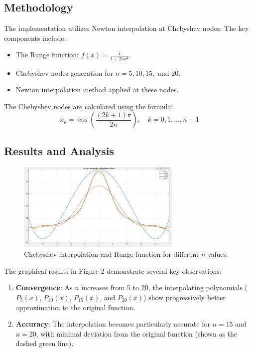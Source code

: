 \documentclass{article}
\begin{document}
\subsection{Methodology}
The implementation utilizes Newton interpolation at Chebyshev nodes. The key components include:
\begin{itemize}
\item The Runge function: $f(x) = \frac{1}{1 + 25x^2}$.
\item Chebyshev nodes generation for $n = 5, 10, 15,$ and $20$.
\item Newton interpolation method applied at these nodes.
\end{itemize}
The Chebyshev nodes are calculated using the formula:
\[x_k = \cos\left(\frac{(2k+1)\pi}{2n}\right), \quad k = 0,1,\ldots,n-1\]
\subsection{Results and Analysis}
\begin{figure}[H]
    \centering
    \includegraphics[width=0.7\textwidth]{runge2.png}
    \caption{Chebyshev interpolation and Runge function for different $n$ values.}
    \label{fig:runge_plot}
\end{figure}
The graphical results in Figure 2 demonstrate several key observations:
\begin{enumerate}
\item \textbf{Convergence}: As $n$ increases from 5 to 20, the interpolating polynomials ($P_5(x)$, $P_{10}(x)$, $P_{15}(x)$, and $P_{20}(x)$) show progressively better approximation to the original function.

\item \textbf{Accuracy}: The interpolation becomes particularly accurate for $n=15$ and $n=20$, with minimal deviation from the original function (shown as the dashed green line).
\end{enumerate}
\end{document}
